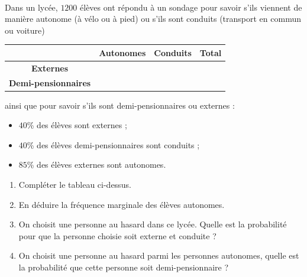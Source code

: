 \documentclass[11pt]{article}
\begin{document}
\begin{exo}~\\
\begin{minipage}{.35\textwidth}
  Dans un lycée, $1200$ élèves ont répondu à un sondage pour savoir s'ils
  viennent de manière autonome (à vélo ou à pied) ou s'ils sont conduits
  (transport en commun ou voiture)
\end{minipage}
\begin{minipage}{.65\textwidth}
\begin{center}
\renewcommand{\arraystretch}{2}
\begin{tabular}{|c|c|c|c|}
  \cline{2-4}
  \multicolumn{1}{c|}{} & \textbf{Autonomes} & \textbf{Conduits} &
  \textbf{Total} \\
  \hline
  \textbf{Externes} & & & \\
  \hline
  \textbf{Demi-pensionnaires} & & & \\
  \hline
\end{tabular}
\end{center}
\end{minipage}
ainsi que pour savoir s'ils sont demi-pensionnaires ou externes :
\begin{itemize}
  \item $40$\% des élèves sont externes ;
  \item $40$\% des élèves demi-pensionnaires sont conduits ;
  \item $85$\% des élèves externes sont autonomes.
\end{itemize}
\begin{enumerate}
  \item Compléter le tableau ci-dessus.
  \item En déduire la fréquence marginale des élèves autonomes.
  \item On choisit une personne au hasard dans ce lycée. Quelle est la
    probabilité pour que la personne choisie soit externe et conduite ?
  \item On choisit une personne au hasard parmi les personnes autonomes, quelle
    est la probabilité que cette personne soit demi-pensionnaire ?
\end{enumerate}
\end{exo}
\end{document}
